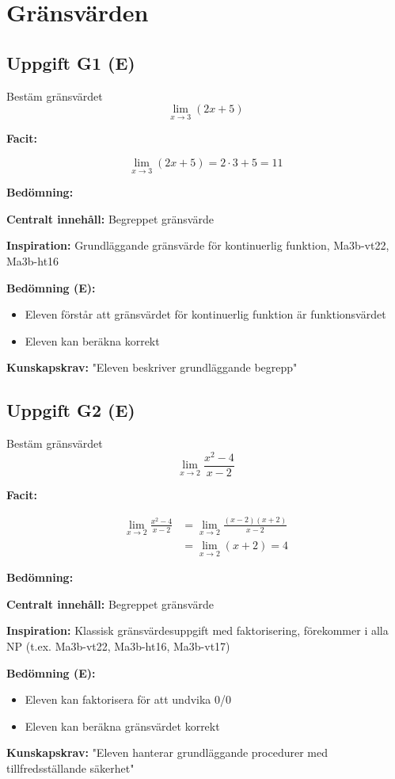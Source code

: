\documentclass[12pt]{article}
\begin{document}
\newpage

\section{Gränsvärden}

\subsection*{Uppgift G1 (E)}
Bestäm gränsvärdet
\[
\lim_{x \to 3} (2x + 5)
\]

\begin{facitbox}
\textbf{Facit:}

\[
\lim_{x \to 3} (2x + 5) = 2 \cdot 3 + 5 = 11
\]
\end{facitbox}

\begin{refbox}
\textbf{Bedömning:}

\textbf{Centralt innehåll:} Begreppet gränsvärde

\textbf{Inspiration:} Grundläggande gränsvärde för kontinuerlig funktion, Ma3b-vt22, Ma3b-ht16

\textbf{Bedömning (E):}
\begin{itemize}
    \item Eleven förstår att gränsvärdet för kontinuerlig funktion är funktionsvärdet
    \item Eleven kan beräkna korrekt
\end{itemize}

\textbf{Kunskapskrav:} "Eleven beskriver grundläggande begrepp"
\end{refbox}

\subsection*{Uppgift G2 (E)}
Bestäm gränsvärdet
\[
\lim_{x \to 2} \frac{x^2 - 4}{x - 2}
\]

\begin{facitbox}
\textbf{Facit:}

\begin{align*}
\lim_{x \to 2} \frac{x^2 - 4}{x - 2} &= \lim_{x \to 2} \frac{(x - 2)(x + 2)}{x - 2} \\
&= \lim_{x \to 2} (x + 2) = 4
\end{align*}
\end{facitbox}

\begin{refbox}
\textbf{Bedömning:}

\textbf{Centralt innehåll:} Begreppet gränsvärde

\textbf{Inspiration:} Klassisk gränsvärdesuppgift med faktorisering, förekommer i alla NP (t.ex. Ma3b-vt22, Ma3b-ht16, Ma3b-vt17)

\textbf{Bedömning (E):}
\begin{itemize}
    \item Eleven kan faktorisera för att undvika 0/0
    \item Eleven kan beräkna gränsvärdet korrekt
\end{itemize}

\textbf{Kunskapskrav:} "Eleven hanterar grundläggande procedurer med tillfredsställande säkerhet"
\end{refbox}
\end{document}
